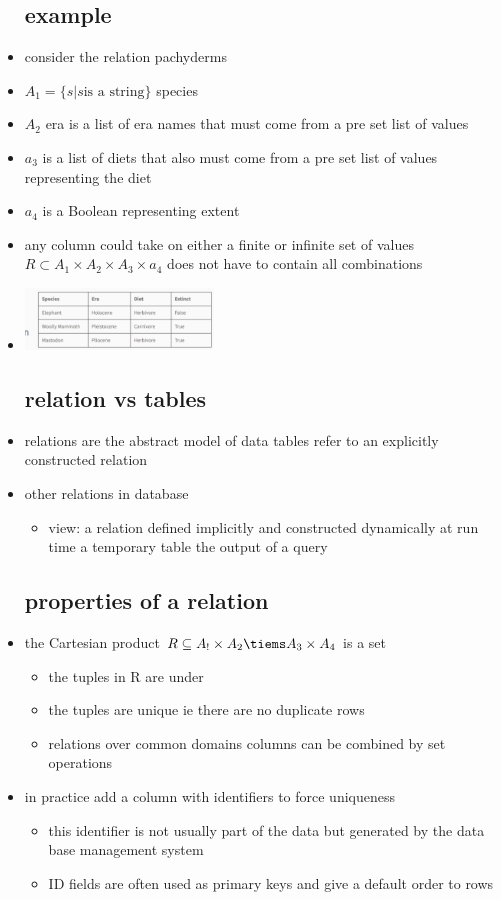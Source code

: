 \documentclass{article}
\begin{document}
\begin{itemize}
\subsection{example}
\item consider the relation pachyderms 
\item $A_1=\{s|s \text{is a string}\}$ species 
\item $A_2$ era is a list of era names that must come from a pre set list of values 
\item $a_3$ is a list of diets that also must come from a pre set list of values representing the diet
\item $a_4$ is a Boolean representing extent 
\item any column could take on either a finite or infinite set of values 
$R\subset A_1\times A_2\times A_3\times a_4$ does not have to contain all combinations 
\item \includegraphics[width=5cm]{lecture notes/week 2/immages/w_1_1.jpg}
\subsection{relation vs tables}
\item relations are the abstract model of data 
\tiem tables refer to an explicitly constructed relation 
\item other relations in database 
\begin{itemize}
    \item view:  a relation defined implicitly and constructed dynamically at run time 
    \itme a temporary table the output of a query
\end{itemize}
\subsection{properties of a relation}
\item the Cartesian product $R\subseteq A_!\times A_2\tiems A_3\times A_4$ is a set 
\begin{itemize}
    \item the tuples in R are under 
    \item the tuples are unique ie there are no duplicate rows
    \item relations over common domains columns can be combined by set operations
\end{itemize}
\item in practice add a column with identifiers to force uniqueness
\begin{itemize}
    \item this identifier is not usually part of the data but generated by the data base management system 
    \item ID fields are often used as primary keys and give a default order to rows
\end{itemize}

\end{itemize}
\end{document}
